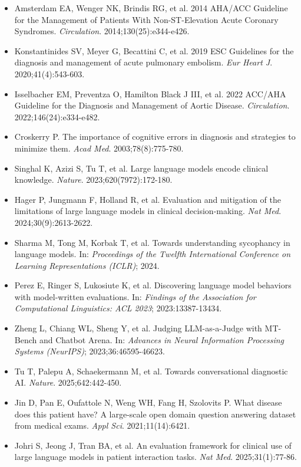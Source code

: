 \documentclass[10pt,a4paper]{article}
\begin{document}
\begin{itemize}
  \item Amsterdam EA, Wenger NK, Brindis RG, et al. 2014 AHA/ACC Guideline for the Management of Patients With Non-ST-Elevation Acute Coronary Syndromes. \textit{Circulation}. 2014;130(25):e344-e426.
  \item Konstantinides SV, Meyer G, Becattini C, et al. 2019 ESC Guidelines for the diagnosis and management of acute pulmonary embolism. \textit{Eur Heart J}. 2020;41(4):543-603.
  \item Isselbacher EM, Preventza O, Hamilton Black J III, et al. 2022 ACC/AHA Guideline for the Diagnosis and Management of Aortic Disease. \textit{Circulation}. 2022;146(24):e334-e482.
  \item Croskerry P. The importance of cognitive errors in diagnosis and strategies to minimize them. \textit{Acad Med}. 2003;78(8):775-780.
  \item Singhal K, Azizi S, Tu T, et al. Large language models encode clinical knowledge. \textit{Nature}. 2023;620(7972):172-180.
  \item Hager P, Jungmann F, Holland R, et al. Evaluation and mitigation of the limitations of large language models in clinical decision-making. \textit{Nat Med}. 2024;30(9):2613-2622.
  \item Sharma M, Tong M, Korbak T, et al. Towards understanding sycophancy in language models. In: \textit{Proceedings of the Twelfth International Conference on Learning Representations (ICLR)}; 2024.
  \item Perez E, Ringer S, Lukosiute K, et al. Discovering language model behaviors with model-written evaluations. In: \textit{Findings of the Association for Computational Linguistics: ACL 2023}; 2023:13387-13434.
  \item Zheng L, Chiang WL, Sheng Y, et al. Judging LLM-as-a-Judge with MT-Bench and Chatbot Arena. In: \textit{Advances in Neural Information Processing Systems (NeurIPS)}; 2023;36:46595-46623.
  \item Tu T, Palepu A, Schaekermann M, et al. Towards conversational diagnostic AI. \textit{Nature}. 2025;642:442-450.
  \item Jin D, Pan E, Oufattole N, Weng WH, Fang H, Szolovits P. What disease does this patient have? A large-scale open domain question answering dataset from medical exams. \textit{Appl Sci}. 2021;11(14):6421.
  \item Johri S, Jeong J, Tran BA, et al. An evaluation framework for clinical use of large language models in patient interaction tasks. \textit{Nat Med}. 2025;31(1):77-86.

\end{itemize}
\end{document}
